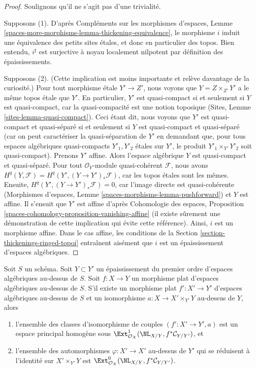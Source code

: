 \begin{proof}
Soulignons qu'il ne s'agit pas d'une trivialité.

\medskip\noindent
Supposons (1). D'après Compléments sur les morphismes d'espaces,
Lemme \ref{spaces-more-morphisms-lemma-thickening-equivalence}, le morphisme
$i$ induit une équivalence des petits sites étales, et donc en particulier des
topos. Bien entendu, $i^\sharp$ est surjective à noyau localement nilpotent par
définition des épaississements.

\medskip\noindent
Supposons (2). (Cette implication est moins importante et relève davantage de
la curiosité.) Pour tout morphisme étale $Y' \to Z'$, nous voyons que
$Y = Z \times_{Z'} Y'$ a le même topos étale que $Y'$. En particulier, $Y'$ est
quasi-compact si et seulement si $Y$ est quasi-compact, car la quasi-compacité
est une notion toposique (Sites, Lemme \ref{sites-lemma-quasi-compact}).
Ceci étant dit, nous voyons que $Y'$ est quasi-compact et quasi-séparé si et
seulement si $Y$ est quasi-compact et quasi-séparé (car on peut caractériser la
quasi-séparation de $Y'$ en demandant que, pour tous espaces algébriques
quasi-compacts $Y'_1, Y'_2$ étales sur $Y'$, le produit
$Y'_1 \times_{Y'} Y'_2$ soit quasi-compact).
Prenons $Y'$ affine. Alors l'espace algébrique $Y$ est quasi-compact et
quasi-séparé. Pour tout $\mathcal{O}_Y$-module quasi-cohérent $\mathcal{F}$,
nous avons
$H^q(Y, \mathcal{F}) = H^q(Y', (Y \to Y')_*\mathcal{F})$, car les topos étales
sont les mêmes. Ensuite,
$H^q(Y', (Y \to Y')_*\mathcal{F}) = 0$, car l'image directe est
quasi-cohérente (Morphismes d'espaces,
Lemme \ref{spaces-morphisms-lemma-pushforward}) et $Y$ est affine.
Il s'ensuit que $Y'$ est affine d'après Cohomologie des espaces, Proposition
\ref{spaces-cohomology-proposition-vanishing-affine} (il existe sûrement une
démonstration de cette implication qui évite cette référence).
Ainsi, $i$ est un morphisme affine. Dans le cas affine, les conditions de la
Section \ref{section-thickenings-ringed-topoi} entraînent aisément que $i$ est
un épaississement d'espaces algébriques.
\end{proof}

\begin{lemma}
\label{lemma-deform-spaces}
Soit $S$ un schéma.
Soit $Y \subset Y'$ un épaississement du premier ordre d'espaces algébriques
au-dessus de $S$.
Soit $f : X \to Y$ un morphisme plat d'espaces algébriques au-dessus de $S$.
S'il existe un morphisme plat $f' : X' \to Y'$ d'espaces algébriques au-dessus
de $S$ et un isomorphisme $a : X \to X' \times_{Y'} Y$ au-dessus de $Y$, alors
\begin{enumerate}
\item l'ensemble des classes d'isomorphisme de couples
$(f' : X' \to Y', a)$ est un espace principal homogène sous
$\Ext^1_{\mathcal{O}_X}(\NL_{X/Y}, f^*\mathcal{C}_{Y/Y'})$, et
\item l'ensemble des automorphismes $\varphi : X' \to X'$ au-dessus de $Y'$
qui se réduisent à l'identité sur $X' \times_{Y'} Y$ est
$\Ext^0_{\mathcal{O}_X}(\NL_{X/Y}, f^*\mathcal{C}_{Y/Y'})$.
\end{enumerate}
\end{lemma}

